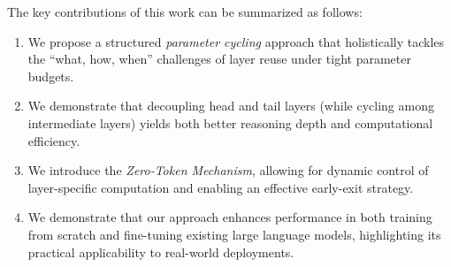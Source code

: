 The key contributions of this work can be summarized as follows:  
\begin{enumerate}  
    \item We propose a structured \emph{parameter cycling} approach that holistically tackles the “what, how, when” challenges of layer reuse under tight parameter budgets.
    
    \item We demonstrate that decoupling head and tail layers (while cycling among intermediate layers) yields both better reasoning depth and computational efficiency.
    
    \item We introduce the \emph{Zero-Token Mechanism}, allowing for dynamic control of layer-specific computation and enabling an effective early-exit strategy.
    
    \item 
    We demonstrate that our approach enhances performance in both training from scratch and fine-tuning existing large language models, highlighting its practical applicability to real-world deployments.

\end{enumerate}  
